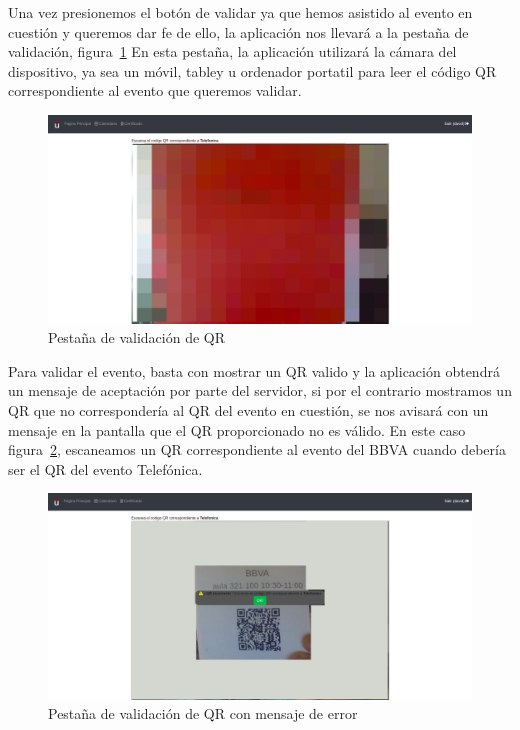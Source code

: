 \documentclass[a4paper, 12pt]{book}
\begin{document}
\begin{enumerate}
	Una vez presionemos el botón de validar ya que hemos asistido al evento en cuestión y queremos dar fe de ello, la aplicación nos llevará a la pestaña de validación, figura~\ref{fig:validarQR}
	En esta pestaña, la aplicación utilizará la cámara del dispositivo, ya sea un móvil, tabley u ordenador portatil para leer el código QR correspondiente al evento que queremos validar.
	\begin{figure}
  	\centering
  	\includegraphics[width=16cm, keepaspectratio]{img/validarQR.png}
  	\caption{Pestaña de validación de QR}\label{fig:validarQR}
	\end{figure}

Para validar el evento, basta con mostrar un QR valido y la aplicación obtendrá un mensaje de aceptación por parte del servidor, si por el contrario mostramos un QR que no correspondería al QR del evento en cuestión, se nos avisará con un mensaje en la pantalla que el QR proporcionado no es válido. En este caso figura~\ref{fig:validarQRFail}, escaneamos un QR correspondiente al evento del BBVA cuando debería ser el QR del evento Telefónica.

	\begin{figure}
  	\centering
  	\includegraphics[width=16cm, keepaspectratio]{img/validarQRFail.png}
  	\caption{Pestaña de validación de QR con mensaje de error}\label{fig:validarQRFail}
	\end{figure}  
  

\end{enumerate}
\end{document}
